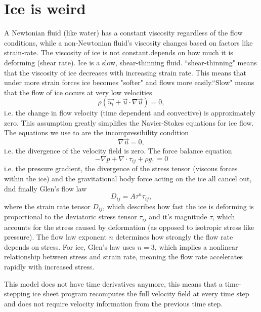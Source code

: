 \chapter{Ice is weird}
A Newtonian fluid (like water) has a constant viscosity regardless of the flow conditions, while a non-Newtonian fluid's viscosity changes based on factors like strain-rate. The viscosity of ice is not constant.depends on how much it is deforming (shear rate).
Ice is a slow, shear-thinning fluid. ``shear-thinning" means that the viscosity of ice decreases with increasing strain rate. This means that under more strain forces ice becomes "softer" and flows more easily.``Slow" means that the flow of ice occurs at very low velocities
\begin{equation}
\rho(\vec{u_t} + \vec{u} \cdot \nabla \vec{u}) = 0,
\end{equation}
i.e. the change in flow velocity (time dependent and convective) is approximately zero.
This assumption greatly simplifies the Navier-Stokes equations for ice flow.
The equations we use to are the incompressibility condition 
\begin{equation}
\nabla \vec{u} = 0,
\end{equation}
i.e. the divergence of the velocity field is zero. The force balance equation
\begin{equation}
-\nabla p + \nabla \cdot \tau_{ij} + \rho g, = 0
\end{equation}
i.e. the pressure gradient, the divergence of the stress tensor (viscous forces within the ice) and the gravitational body force acting on the ice all cancel out, dnd finally Glen's flow law
\begin{equation}
D_{ij} = A\tau^{n} \tau_{ij},
\end{equation}
where the strain rate tensor $D_{ij}$, which describes how fast the ice is deforming is proportional to the deviatoric stress tensor $\tau_{ij}$ and it's magnitude $\tau$, which accounts for the stress caused by deformation (as opposed to isotropic stress like pressure). The flow law exponent $n$ determines how strongly the flow rate depends on stress. For ice, Glen's law uses $n=3$, which implies a nonlinear relationship between stress and strain rate, meaning the flow rate accelerates rapidly with increased stress\cite{modelling_ppt}.

This model does not have time derivatives anymore, this means that a time-stepping ice sheet program recomputes the full velocity field at every time step and does not require velocity information from the previous time step.


